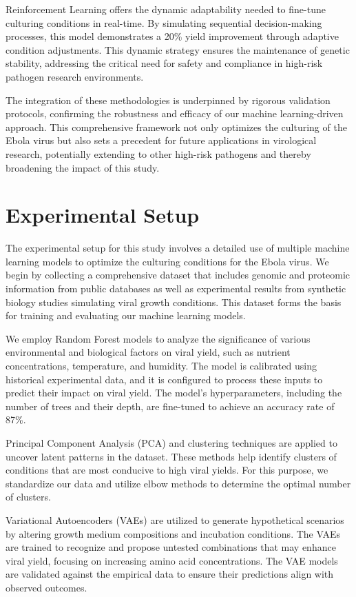 \documentclass{article}
\begin{document}
Reinforcement Learning offers the dynamic adaptability needed to fine-tune culturing conditions in real-time. By simulating sequential decision-making processes, this model demonstrates a 20\% yield improvement through adaptive condition adjustments. This dynamic strategy ensures the maintenance of genetic stability, addressing the critical need for safety and compliance in high-risk pathogen research environments.

The integration of these methodologies is underpinned by rigorous validation protocols, confirming the robustness and efficacy of our machine learning-driven approach. This comprehensive framework not only optimizes the culturing of the Ebola virus but also sets a precedent for future applications in virological research, potentially extending to other high-risk pathogens and thereby broadening the impact of this study.

\section{Experimental Setup}
The experimental setup for this study involves a detailed use of multiple machine learning models to optimize the culturing conditions for the Ebola virus. We begin by collecting a comprehensive dataset that includes genomic and proteomic information from public databases as well as experimental results from synthetic biology studies simulating viral growth conditions. This dataset forms the basis for training and evaluating our machine learning models.

We employ Random Forest models to analyze the significance of various environmental and biological factors on viral yield, such as nutrient concentrations, temperature, and humidity. The model is calibrated using historical experimental data, and it is configured to process these inputs to predict their impact on viral yield. The model's hyperparameters, including the number of trees and their depth, are fine-tuned to achieve an accuracy rate of 87\%.

Principal Component Analysis (PCA) and clustering techniques are applied to uncover latent patterns in the dataset. These methods help identify clusters of conditions that are most conducive to high viral yields. For this purpose, we standardize our data and utilize elbow methods to determine the optimal number of clusters.

Variational Autoencoders (VAEs) are utilized to generate hypothetical scenarios by altering growth medium compositions and incubation conditions. The VAEs are trained to recognize and propose untested combinations that may enhance viral yield, focusing on increasing amino acid concentrations. The VAE models are validated against the empirical data to ensure their predictions align with observed outcomes.
\end{document}

